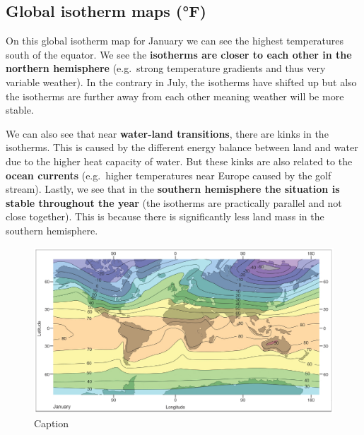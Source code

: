 \documentclass[12pt,oneside]{book}
\begin{document}
\subsection{Global isotherm maps (°F)}\label{global-isotherm-maps-f}

On this global isotherm map for January we can see the highest
temperatures south of the equator. We see the \textbf{isotherms are
closer to each other in the northern hemisphere} (e.g.~strong
temperature gradients and thus very variable weather). In the contrary
in July, the isotherms have shifted up but also the isotherms are
further away from each other meaning weather will be more stable.

We can also see that near \textbf{water-land transitions}, there are
kinks in the isotherms. This is caused by the different energy balance
between land and water due to the higher heat capacity of water. But
these kinks are also related to the \textbf{ocean currents} (e.g.~higher
temperatures near Europe caused by the golf stream). Lastly, we see that
in the \textbf{southern hemisphere the situation is stable throughout
the year} (the isotherms are practically parallel and not close
together). This is because there is significantly less land mass in the
southern hemisphere.

\begin{figure}

{\centering \includegraphics[width=1\linewidth]{figures/Figure218} 

}

\caption{Caption}\label{fig:Isotherm}
\end{figure}
\end{document}
